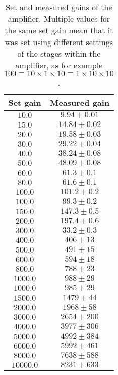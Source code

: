 \begin{table}[H]
	\renewcommand{\arraystretch}{1}
	\centering
		\begin{tabular}{|c|c|}
			\hline
			Set gain & Measured gain \\
			\hline
			$10.0$ & $9.94 \pm 0.01$ \\
			\hline
			$15.0$ & $14.84 \pm 0.02$ \\
			\hline
			$20.0$ & $19.58 \pm 0.03$ \\
			\hline
			$30.0$ & $29.22 \pm 0.04$ \\
			\hline
			$40.0$ & $38.24 \pm 0.08$ \\
			\hline
			$50.0$ & $48.09 \pm 0.08$ \\
			\hline
			$60.0$ & $61.3 \pm 0.1$ \\
			\hline
			$80.0$ & $61.6 \pm 0.1$ \\
			\hline
			$100.0$ & $101.2 \pm 0.2$ \\
			\hline
			$100.0$ & $99.3 \pm 0.2$ \\
			\hline
			$150.0$ & $147.3 \pm 0.5$ \\
			\hline
			$200.0$ & $197.4 \pm 0.6$ \\
			\hline
			$300.0$ & $33.2 \pm 0.3$ \\
			\hline
			$400.0$ & $406 \pm 13$ \\
			\hline
			$500.0$ & $491 \pm 15$ \\
			\hline
			$600.0$ & $594 \pm 18$ \\
			\hline
			$800.0$ & $788 \pm 23$ \\
			\hline
			$1000.0$ & $988 \pm 29$ \\
			\hline
			$1000.0$ & $985 \pm 29$ \\
			\hline
			$1500.0$ & $1479 \pm 44$ \\
			\hline
			$2000.0$ & $1968 \pm 58$ \\ 
			$3000.0$ & $2654 \pm 200$ \\
			\hline
			$4000.0$ & $3977 \pm 306$ \\
			\hline
			$5000.0$ & $4992 \pm 384$ \\
			\hline
			$6000.0$ & $5992 \pm 461$ \\
			\hline
			$8000.0$ & $7638 \pm 588$ \\
			\hline
			$10000.0$ & $8231 \pm 633$ \\
			\hline
		\end{tabular}
	\caption{Set and measured gains of the amplifier. Multiple values for the same set gain mean that it was set using different settings of the stages within the amplifier, as for example $100 \equiv 10 \times 1 \times 10 \equiv 1 \times 10 \times 10$.}
	\label{tab:gains}
\end{table}


